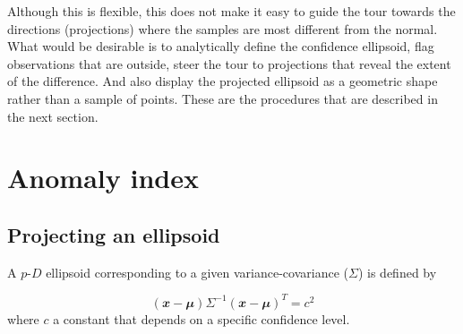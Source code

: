 \documentclass[
  12pt]{article}
\newcommand\pD{$p\text{-}D$}
\begin{document}
Although this is flexible, this does not make it easy to guide the tour
towards the directions (projections) where the samples are most
different from the normal. What would be desirable is to analytically
define the confidence ellipsoid, flag observations that are outside,
steer the tour to projections that reveal the extent of the difference.
And also display the projected ellipsoid as a geometric shape rather
than a sample of points. These are the procedures that are described in
the next section.

\section{Anomaly index}\label{sec-anomaly-index}

\subsection{Projecting an ellipsoid}\label{projecting-an-ellipsoid}

A \pD{} ellipsoid corresponding to a given variance-covariance
(\(\Sigma\)) is defined by

\[
(\mathbfit{x}-\mathbfit{\mu}) \Sigma^{-1}(\mathbfit{x}-\mathbfit{\mu})^T = c^2
\] where \(c\) a constant that depends on a specific confidence level.
\end{document}

